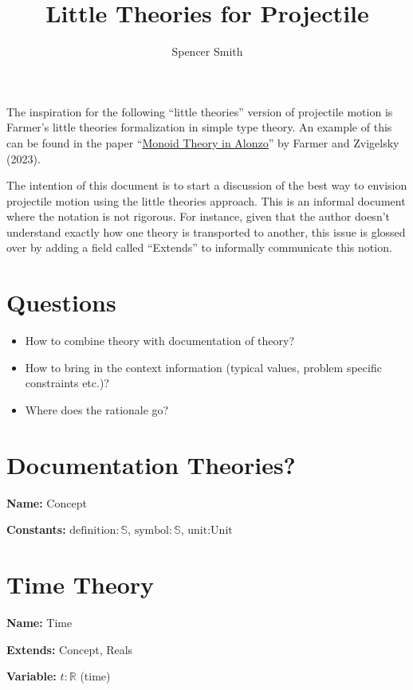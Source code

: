 \documentclass{article}
\title{Little Theories for Projectile}
\author{Spencer Smith}
\begin{document}
\maketitle

The inspiration for the following ``little theories'' version of projectile
motion is Farmer's little theories formalization in simple type theory.  An
example of this can be found in the paper
``\href{https://imps.mcmaster.ca/doc/monoids.pdf} {Monoid Theory in Alonzo}'' by
Farmer and Zvigelsky (2023).

The intention of this document is to start a discussion of the best way to
envision projectile motion using the little theories approach.  This is an
informal document where the notation is not rigorous.  For instance, given that
the author doesn't understand exactly how one theory is transported to another,
this issue is glossed over by adding a field called ``Extends'' to informally
communicate this notion.

\section{Questions}

\begin{itemize}
    \item How to combine theory with documentation of theory?
    \item How to bring in the context information (typical values, problem
    specific constraints etc.)?
    \item Where does the rationale go?
\end{itemize}

\section{Documentation Theories?}

\noindent \textbf{Name:} Concept

\noindent \textbf{Constants:} $\text{definition}: \mathbb{S}$, $\text{symbol}:
\mathbb{S}$, $\text{unit}: \text{Unit}$

\section{Time Theory}

\noindent \textbf{Name:} Time

\noindent \textbf{Extends:} Concept, Reals

\noindent \textbf{Variable:} $t: {\mathbb{R}}$ (time)
\end{document}
